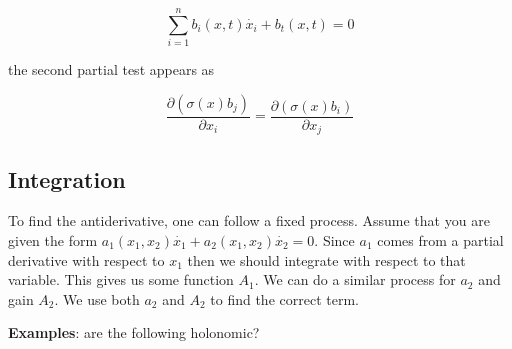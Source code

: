 \[\sum_{i=1}^{n} b_i (x,t) \dot{x_i} + b_t(x,t) = 0\]

the second partial test appears as

\[\frac{\partial \left( \sigma(x)b_j \right)}{\partial x_i}
= \frac{\partial \left( \sigma(x)b_i \right)}{\partial x_j}\]

\hypertarget{integration}{%
\subsection{Integration}\label{integration}}

To find the antiderivative, one can follow a fixed process. Assume that
you are given the form
\(a_1(x_1,x_2) \dot{x_1} + a_2(x_1,x_2)\dot{x_2} = 0\). Since \(a_1\)
comes from a partial derivative with respect to \(x_1\) then we should
integrate with respect to that variable. This gives us some function
\(A_1\). We can do a similar process for \(a_2\) and gain \(A_2\). We
use both \(a_2\) and \(A_2\) to find the correct term.

\textbf{Examples}: are the following holonomic?

